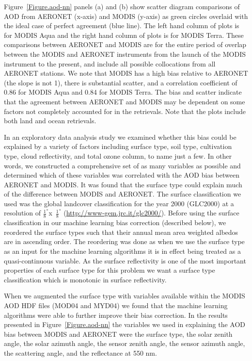 \documentclass[journal]{IEEEtran}
\begin{document}
Figure~\ref{Figure.aod-nn} panels (a) and (b) show scatter diagram comparisons of AOD from AERONET (x-axis) and MODIS (y-axis) as green circles overlaid with the ideal case of perfect agreement (blue line). The left hand column of plots is for MODIS Aqua and the right hand column of plots is for MODIS Terra. These comparisons between AERONET and MODIS are for the entire period of overlap between the MODIS and AERONET instruments from the launch of the MODIS instrument to the present, and include all possible collocations from all AERONET stations. We note that MODIS has a high bias relative to AERONET (the slope is not 1), there is substantial scatter, and a correlation coefficient of 0.86 for MODIS Aqua and 0.84 for MODIS Terra. The bias and scatter indicate that the agreement between AERONET and MODIS may be dependent on some factors not completely accounted for in the retrievals.  Note that the plots include both land and ocean retrievals. 

In an exploratory data analysis study we examined whether this bias could be explained by a variety of factors including surface type, soil type, cultivation type, cloud reflectivity, and total ozone column, to name just a few. In other words, we constructed a comprehensive set of as many variables as possible and determined which of these variables was correlated with the AOD bias between AERONET and MODIS. It was found that the surface type could explain much of the difference between MODIS and AERONET. The surface classification we used was the global landcover classification for the year 2000 (GLC2000) at a resolution of $\frac{1}{8}^\circ$x\ $\frac{1}{8}^\circ$ (\url{http://www-gem.jrc.it/glc2000/}). Before using the surface classification in our machine learning bias correction (described below), we reordered the surface types such that their annual mean area weighted albedos are in ascending order. The reordering was done as when we use the surface type as an input for the machine learning algorithms it is in effect being treated as a quasi-continuous variable. As the surface reflectivity is one of the most important properties of each surface type for this problem we want a surface type classification which is monotonic in surface reflectivity.

When we augmented the surface type with variables available within the MODIS AOD HDF files (MOD04 and MYD04) we found that the machine learning algorithms were able to further improve their bias correction. In the results presented in Figure~\ref{Figure.aod-nn} the variables we used in explaining the AOD bias  between MODIS and AERONET were the surface type, the solar zenith angle, the solar azimuth angle, the sensor zenith angle, the sensor azimuth angle, the scattering angle, and the reflectance at 550 nm.
\end{document}
